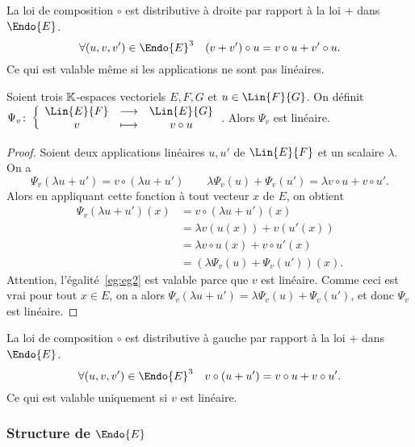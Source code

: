 \begin{cor}
  La loi de composition $\circ$ est distributive à droite par rapport à la loi $+$ dans $\Endo{E}$. 
  \begin{equation}
    \forall (u,v,v') \in \Endo{E}^3 \quad (v+v') \circ u = v \circ u + v' \circ u.
  \end{equation}
  Ce qui est valable même si les applications ne sont pas linéaires.
\end{cor}

\begin{prop}
  Soient trois $\mathbb{K}$-espaces vectoriels $E,F,G$ et $u \in \Lin{F}{G}$. On définit $\fonction{\Psi_v}{\Lin{E}{F}}{\Lin{E}{G}}{v}{v \circ u}$. Alors $\Psi_v$ est linéaire.
\end{prop}
\begin{proof}
  Soient deux applications linéaires $u,u'$ de $\Lin{E}{F}$ et un scalaire $\lambda$. On a
  \begin{equation}
    \Psi_v(\lambda u+u')=v \circ (\lambda u+u') \qquad \lambda \Psi_v(u)+\Psi_v(u')=\lambda v \circ u + v \circ u'.
  \end{equation}
  Alors en appliquant cette fonction à tout vecteur $x$ de $E$, on obtient
  \begin{align}
    \Psi_v(\lambda u+u')(x)&=v \circ (\lambda u+u')(x) \\
    &=\lambda v(u(x)) + v(u'(x)) \label{eg:eg2}\\
    &=\lambda v\circ u(x) +v\circ u'(x) \\
    &=(\lambda \Psi_v(u)+\Psi_v(u'))(x).
  \end{align}
  Attention, l'égalité~\eqref{eg:eg2} est valable parce que $v$ est linéaire. Comme ceci est vrai pour tout $x \in E$, on a alors $\Psi_v(\lambda u+u')=\lambda \Psi_v(u)+\Psi_v(u')$, et donc $\Psi_v$ est linéaire.
\end{proof}
\begin{cor}
  La loi de composition $\circ$ est distributive à gauche par rapport à la loi $+$ dans $\Endo{E}$. 
  \begin{equation}
    \forall (u,v,v') \in \Endo{E}^3 \quad v \circ (u+u') = v \circ u + v \circ u'.
  \end{equation}
  Ce qui est valable uniquement si $v$ est linéaire.
\end{cor}

\subsubsection{Structure de $\Endo{E}$}

